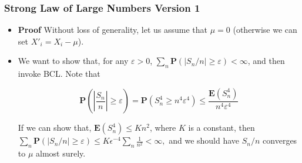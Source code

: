 \documentclass[handout]{beamer}
\newcommand{\BP}{\mathbf{P}}
\newcommand{\BE}{\mathbf{E}}
\begin{document}
\frame
{
  \frametitle{Strong Law of Large Numbers Version 1}

   \begin{itemize}
      \begin{Theorem}[SLLN V1] For a sequence of independent random variables $X_1, X_2,\ldots$ with the same mean $\mu$ and bounded finite fourth central moments  ($\BE(X_i-\mu)^4\leq a < \infty)$, define $S_n=X_1+X_2+\cdots +X_n$, then $S_n/n$ converges to $\mu$ almost surely.
      
   \end{Theorem}
      
      \item<2-> \textbf{Proof} Without loss of generality, let us assume that $\mu=0$ (otherwise we can set $X'_i=X_i-\mu$). 
      
      \item<3->[-] We want to show that, for any $\varepsilon>0$, $\sum_n \BP(|S_n/n|\geq \varepsilon)<\infty$, and then invoke BCL. Note that  
      
             $$\BP(|\frac{S_n}{n}|\geq \varepsilon)= \BP(S_n^4 \geq n^4 \varepsilon^4)  \leq \frac{\BE(S_n^4)}{n^4\varepsilon^4}$$
             
       If we can show that, $\BE(S_n^4) \leq K n^2$, where $K$ is a constant, then $\sum_n \BP(|S_n/n|\geq \varepsilon)\leq K\epsilon^{-4} \sum_n \frac{1}{n^2}<\infty,$ and we should have $S_n/n$ converges to $\mu$ almost surely.
                 
                                      
\end{itemize}
}
\end{document}
